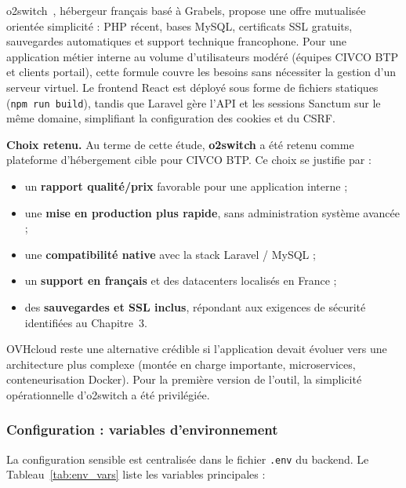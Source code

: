 \medskip

o2switch~\cite{o2switch}, hébergeur français basé à Grabels, propose une offre
mutualisée orientée simplicité : PHP récent, bases MySQL, certificats SSL gratuits,
sauvegardes automatiques et support technique francophone. Pour une application métier
interne au volume d'utilisateurs modéré (équipes CIVCO BTP et clients portail), cette
formule couvre les besoins sans nécessiter la gestion d'un serveur virtuel. Le frontend
React est déployé sous forme de fichiers statiques (\texttt{npm run build}), tandis que
Laravel gère l'API et les sessions Sanctum sur le même domaine, simplifiant la
configuration des cookies et du CSRF.

\medskip

\textbf{Choix retenu.} Au terme de cette étude, \textbf{o2switch} a été retenu comme
plateforme d'hébergement cible pour CIVCO BTP. Ce choix se justifie par :

\begin{itemize}
  \item un \textbf{rapport qualité/prix} favorable pour une application interne ;
  \item une \textbf{mise en production plus rapide}, sans administration système
  avancée ;
  \item une \textbf{compatibilité native} avec la stack Laravel / MySQL ;
  \item un \textbf{support en français} et des datacenters localisés en France ;
  \item des \textbf{sauvegardes et SSL inclus}, répondant aux exigences de sécurité
  identifiées au Chapitre~3.
\end{itemize}

OVHcloud reste une alternative crédible si l'application devait évoluer vers une
architecture plus complexe (montée en charge importante, microservices, conteneurisation
Docker). Pour la première version de l'outil, la simplicité opérationnelle d'o2switch
a été privilégiée.

\subsubsection{Configuration : variables d'environnement}

La configuration sensible est centralisée dans le fichier \texttt{.env} du backend.
Le Tableau~\ref{tab:env_vars} liste les variables principales :

